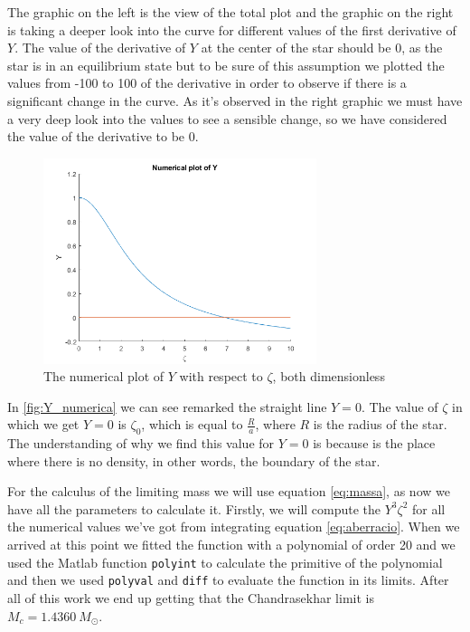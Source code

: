 \documentclass[a4paper]{article}
\newcommand\Msun{M_{\odot}}
\begin{document}
The graphic on the left is the view of the total plot and the graphic on the right is taking a deeper look into the curve for different values of the first derivative of $Y$. The value of the derivative of $Y$ at the center of the star should be 0, as the star is in an equilibrium state but to be sure of this assumption we plotted the values from -100 to 100 of the derivative in order to observe if there is a significant change in the curve. As it's observed in the right graphic we must have a very deep look into the values to see a sensible change, so we have considered the value of the derivative to be 0.

\begin{figure}[h]
    \centering
    \includegraphics[width=8cm]{images/Y_numerica.png}
    \caption{The numerical plot of $Y$ with respect to $\zeta$, both dimensionless}
    \label{fig:Y_numerica}
\end{figure}

In \autoref{fig:Y_numerica} we can see remarked the straight line $Y=0$. The value of $\zeta$ in which we get $Y=0$ is $\zeta_0$, which is equal to $\frac{R}{a}$, where $R$ is the radius of the star. The understanding of why we find this value for $Y=0$ is because is the place where there is no density, in other words, the boundary of the star.

For the calculus of the limiting mass we will use equation \eqref{eq:massa}, as now we have all the parameters to calculate it. Firstly, we will compute the $Y^3\zeta^2$ for all the numerical values we've got from integrating equation \eqref{eq:aberracio}. When we arrived at this point we fitted the function with a polynomial of order 20 and we used the Matlab function \texttt{polyint} to calculate the primitive of the polynomial and then we used \texttt{polyval} and \texttt{diff} to evaluate the function in its limits. After all of this work we end up getting that the Chandrasekhar limit is $M_c=\qty{1.4360}{\Msun}$.
\end{document}
